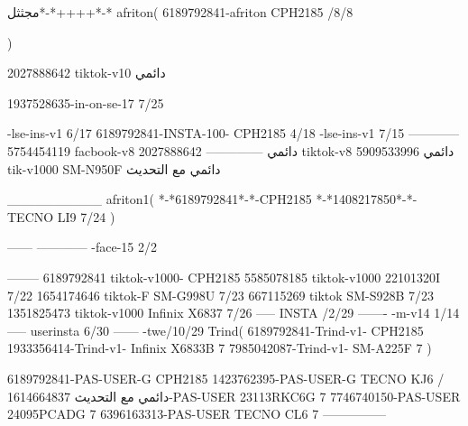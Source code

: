 مجثثل*-*++++*-*
afriton(
6189792841-afriton CPH2185  /8/8

)

2027888642 tiktok-v10
دائمي

1937528635-in-on-se-17 7/25

-lse-ins-v1 6/17
6189792841-INSTA-100- CPH2185 4/18
-lse-ins-v1 7/15
------------
5754454119 facbook-v8
دائمي
--------------
2027888642 tiktok-v8
دائمي
5909533996 tik-v1000  SM-N950F
دائمي مع التحديث

__________
afriton1(
*-*6189792841*-*-CPH2185
*-*1408217850*-*-   TECNO LI9  7/24
)


------
------------
-face-15 2/2

--------
6189792841 tiktok-v1000- CPH2185 
5585078185 tiktok-v1000 22101320I  7/22
1654174646 tiktok-F SM-G998U  7/23
667115269 tiktok SM-S928B  7/23
1351825473 tiktok-v1000 Infinix X6837  7/26
-----
 INSTA /2/29
-------
-m-v14 1/14
-----
userinsta 6/30
------
-twe/10/29
Trind(
6189792841-Trind-v1- CPH2185 
1933356414-Trind-v1- Infinix X6833B 7
7985042087-Trind-v1- SM-A225F 7
)


6189792841-PAS-USER-G CPH2185 
1423762395-PAS-USER-G TECNO KJ6  /دائمي مع التحديث
1614664837-PAS-USER 23113RKC6G 7
7746740150-PAS-USER 24095PCADG 7
6396163313-PAS-USER TECNO CL6 7
    ---------------
